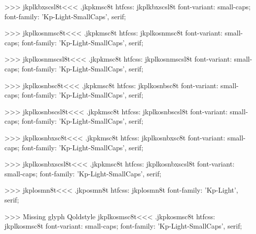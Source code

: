 >>>
\<jkplkbxscsl8t\><<<
.jkpkmsc8t
htfcss:  jkplkbxscsl8t  font-variant: small-caps; font-family: 'Kp-Light-SmallCaps', serif;

>>>
\<jkplkosnmsc8t\><<<
.jkpkmsc8t
htfcss:  jkplkosnmsc8t  font-variant: small-caps; font-family: 'Kp-Light-SmallCaps', serif;

>>>
\<jkplkosnmscsl8t\><<<
.jkpkmsc8t
htfcss:  jkplkosnmscsl8t  font-variant: small-caps; font-family: 'Kp-Light-SmallCaps', serif;

>>>
\<jkplkosnbsc8t\><<<
.jkpkmsc8t
htfcss:  jkplkosnbsc8t  font-variant: small-caps; font-family: 'Kp-Light-SmallCaps', serif;

>>>
\<jkplkosnbscsl8t\><<<
.jkpkmsc8t
htfcss:  jkplkosnbscsl8t  font-variant: small-caps; font-family: 'Kp-Light-SmallCaps', serif;

>>>
\<jkplkosnbxsc8t\><<<
.jkpkmsc8t
htfcss:  jkplkosnbxsc8t  font-variant: small-caps; font-family: 'Kp-Light-SmallCaps', serif;

>>>
\<jkplkosnbxscsl8t\><<<
.jkpkmsc8t
htfcss:  jkplkosnbxscsl8t  font-variant: small-caps; font-family: 'Kp-Light-SmallCaps', serif;

>>>
\<jkplosmn8t\><<<
.jkposmn8t
htfcss:  jkplosmn8t  font-family: 'Kp-Light', serif;

>>>
Missing glyph	Qoldstyle
\<jkplkosmsc8t\><<<
.jkpkosmsc8t
htfcss:  jkplkosmsc8t  font-variant: small-caps; font-family: 'Kp-Light-SmallCaps', serif;

